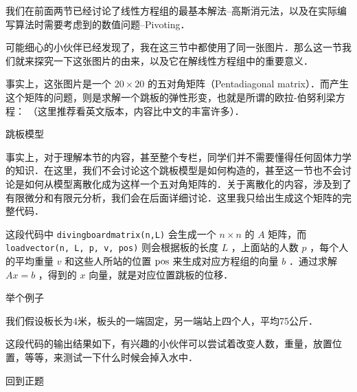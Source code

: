 

我们在前面两节已经讨论了线性方程组的最基本解法--高斯消元法，以及在实际编写算法时需要考虑到的数值问题--Pivoting．

可能细心的小伙伴已经发现了，我在这三节中都使用了同一张图片．那么这一节我们就来探究一下这张图片的由来，以及它在解线性方程组中的重要意义．

事实上，这张图片是一个  $20\times20$  的五对角矩阵（Pentadiagonal matrix）．而产生这个矩阵的问题，则是求解一个跳板的弹性形变，也就是所谓的欧拉-伯努利梁方程： （这里推荐看英文版本，内容比中文的丰富许多）．

跳板模型

事实上，对于理解本节的内容，甚至整个专栏，同学们并不需要懂得任何固体力学的知识．在这里，我们不会讨论这个跳板模型是如何构造的，甚至这一节也不会讨论是如何从模型离散化成为这样一个五对角矩阵的．关于离散化的内容，涉及到了有限微分和有限元分析，我们会在后面详细讨论．这里我只给出生成这个矩阵的完整代码．

这段代码中 \verb|divingboardmatrix(n,L)| 会生成一个  $n\times n$  的  $A$  矩阵，而 \verb|loadvector(n, L, p, v, pos)| 则会根据板的长度  $L$  ，上面站的人数  $p$  ，每个人的平均重量  $v$  和这些人所站的位置  $\rm{pos}$  来生成对应方程组的向量  $b$  ．通过求解  $Ax=b$  ，得到的  $x$  向量，就是对应位置跳板的位移．

举个例子

我们假设板长为4米，板头的一端固定，另一端站上四个人，平均75公斤．

这段代码的输出结果如下，有兴趣的小伙伴可以尝试着改变人数，重量，放置位置，等等，来测试一下什么时候会掉入水中．



回到正题

